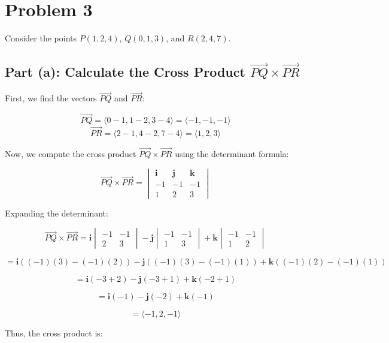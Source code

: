 \documentclass[11pt]{article}
\begin{document}
\section{Problem 3}
Consider the points $P(1, 2, 4)$, $Q(0, 1, 3)$, and $R(2, 4, 7)$.

\subsection{Part (a): Calculate the Cross Product $\overrightarrow{PQ} \times \overrightarrow{PR}$}

First, we find the vectors $\overrightarrow{PQ}$ and $\overrightarrow{PR}$:

\[
\overrightarrow{PQ} = \langle 0 - 1, 1 - 2, 3 - 4 \rangle = \langle -1, -1, -1 \rangle
\]
\[
\overrightarrow{PR} = \langle 2 - 1, 4 - 2, 7 - 4 \rangle = \langle 1, 2, 3 \rangle
\]

Now, we compute the cross product $\overrightarrow{PQ} \times \overrightarrow{PR}$ using the determinant formula:

\[
\overrightarrow{PQ} \times \overrightarrow{PR} = \begin{vmatrix}
\mathbf{i} & \mathbf{j} & \mathbf{k} \\
-1 & -1 & -1 \\
1 & 2 & 3
\end{vmatrix}
\]

Expanding the determinant:

\[
\overrightarrow{PQ} \times \overrightarrow{PR} = \mathbf{i} \begin{vmatrix} -1 & -1 \\ 2 & 3 \end{vmatrix} - \mathbf{j} \begin{vmatrix} -1 & -1 \\ 1 & 3 \end{vmatrix} + \mathbf{k} \begin{vmatrix} -1 & -1 \\ 1 & 2 \end{vmatrix}
\]

\[
= \mathbf{i}((-1)(3) - (-1)(2)) - \mathbf{j}((-1)(3) - (-1)(1)) + \mathbf{k}((-1)(2) - (-1)(1))
\]

\[
= \mathbf{i}(-3 + 2) - \mathbf{j}(-3 + 1) + \mathbf{k}(-2 + 1)
\]

\[
= \mathbf{i}(-1) - \mathbf{j}(-2) + \mathbf{k}(-1)
\]

\[
= \langle -1, 2, -1 \rangle
\]

Thus, the cross product is:
\end{document}
